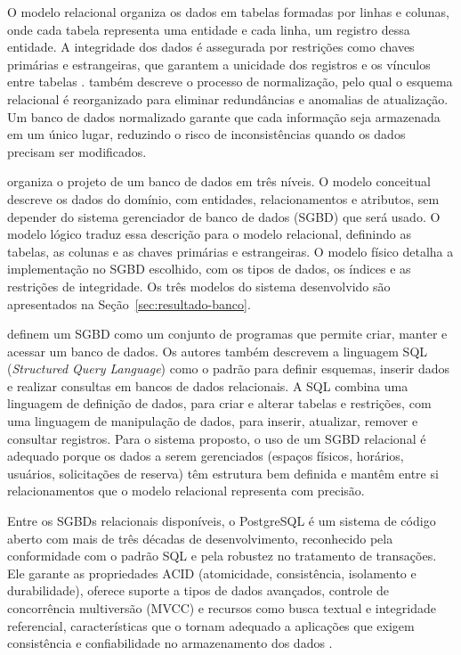O modelo relacional organiza os dados em tabelas formadas por linhas e colunas, onde cada tabela representa uma entidade e cada linha, um registro dessa entidade. A integridade dos dados é assegurada por restrições como chaves primárias e estrangeiras, que garantem a unicidade dos registros e os vínculos entre tabelas \cite{silberschatz2012}.  também descreve o processo de normalização, pelo qual o esquema relacional é reorganizado para eliminar redundâncias e anomalias de atualização. Um banco de dados normalizado garante que cada informação seja armazenada em um único lugar, reduzindo o risco de inconsistências quando os dados precisam ser modificados.

 organiza o projeto de um banco de dados em três níveis. O modelo conceitual descreve os dados do domínio, com entidades, relacionamentos e atributos, sem depender do sistema gerenciador de banco de dados (SGBD) que será usado. O modelo lógico traduz essa descrição para o modelo relacional, definindo as tabelas, as colunas e as chaves primárias e estrangeiras. O modelo físico detalha a implementação no SGBD escolhido, com os tipos de dados, os índices e as restrições de integridade. Os três modelos do sistema desenvolvido são apresentados na Seção~\ref{sec:resultado-banco}.

 definem um SGBD como um conjunto de programas que permite criar, manter e acessar um banco de dados. Os autores também descrevem a linguagem SQL (\textit{Structured Query Language}) como o padrão para definir esquemas, inserir dados e realizar consultas em bancos de dados relacionais. A SQL combina uma linguagem de definição de dados, para criar e alterar tabelas e restrições, com uma linguagem de manipulação de dados, para inserir, atualizar, remover e consultar registros. Para o sistema proposto, o uso de um SGBD relacional é adequado porque os dados a serem gerenciados (espaços físicos, horários, usuários, solicitações de reserva) têm estrutura bem definida e mantêm entre si relacionamentos que o modelo relacional representa com precisão.

Entre os SGBDs relacionais disponíveis, o PostgreSQL é um sistema de código aberto com mais de três décadas de desenvolvimento, reconhecido pela conformidade com o padrão SQL e pela robustez no tratamento de transações. Ele garante as propriedades ACID (atomicidade, consistência, isolamento e durabilidade), oferece suporte a tipos de dados avançados, controle de concorrência multiversão (MVCC) e recursos como busca textual e integridade referencial, características que o tornam adequado a aplicações que exigem consistência e confiabilidade no armazenamento dos dados \cite{postgresql2024}.

